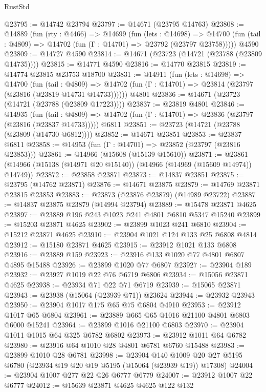 \begin{lexlean}{RustStd}
\begin{coremodule}
@23795 := @14742 @23794
@23797 := @14671 (@23795 @14763)
@23808 := @14889
    (fun (rty : @4466) =>
    @14699
      (fun (lets : @14698) =>
      @14700 (fun (tail : @4809) => @14702 (fun (Γ : @14701) => @23792 (@23797 @23758)))))
    @4590
@23809 := @14727 @4590
@23814 := @14671 (@23723 (@14721 (@23788 (@23809 @14735))))
@23815 := @14771 @4590
@23816 := @14770 @23815
@23819 := @14774 @23815 @23753 @18700
@23831 := @14911
    (fun (lets : @14698) =>
    @14700
      (fun (tail : @4809) =>
      @14702 (fun (Γ : @14701) => @23814 (@23797 (@23816 (@23819 @14731 @14733))))))
    @4801
@23836 := @14671 (@23723 (@14721 (@23788 (@23809 @17223))))
@23837 := @23819 @4801
@23846 := @14935
    (fun (tail : @4809) => @14702 (fun (Γ : @14701) => @23836 (@23797 (@23816 (@23837 @14733)))))
    @6811
@23851 := @23723 (@14721 (@23788 (@23809 (@14730 @6812))))
@23852 := @14671 @23851
@23853 := @23837 @6811
@23858 := @14953 (fun (Γ : @14701) => @23852 (@23797 (@23816 @23853)))
@23861 := @14966 (@15608 (@15139 @15610))
@23871 := @23861 (@14966 (@15138 (@14971 @20 @15140)) (@14966 (@14969 (@15609 @14974)) @14749))
@23872 := @23858 @23871
@23873 := @14837 @23851
@23875 := @23795 (@14762 @23871)
@23876 := @14671 @23875
@23879 := @14769 @23871 @23815 @23853
@23883 := @23873 (@23876 @23879) (@14989 @23722)
@23887 := @14837 @23875 @23879 (@14994 @23794)
@23889 := @15478 @23871 @4625
@23897 := @23889 @196 @243 @1023 @241 @4801 @6810 @5347 @15240
@23899 := @15203 @23871 @4625
@23902 := @23899 @1023 @241 @6810
@23904 := @15212 @23871 @4625
@23910 := @23904 @1021 @124 @133 @25 @6808 @4814
@23912 := @15180 @23871 @4625
@23915 := @23912 @1021 @133 @6808
@23916 := @23889 @159
@23923 := @23916 @133 @1020 @77 @4801 @6807 @4895 @15488
@23926 := @23899 @1020 @77 @6807
@23927 := @23904 @189
@23932 := @23927 @1019 @22 @76 @6719 @6806
@23934 := @15056 @23871 @4625
@23938 := @23934 @71 @22 @71 @6719
@23939 := @15065 @23871
@23943 := @23938 (@15064 (@23939 @71)) @23624
@23944 := @23932 @23943
@23950 := @23904 @1017 @175 @65 @75 @6804 @4910
@23953 := @23912 @1017 @65 @6804
@23961 := @23889 @665 @65 @1016 @21100 @4801 @6803 @6000 @15241
@23964 := @23899 @1016 @21100 @6803
@23970 := @23904 @1011 @1015 @64 @325 @6782 @6802
@23973 := @23912 @1011 @64 @6782
@23980 := @23916 @64 @1010 @28 @4801 @6781 @6760 @15488
@23983 := @23899 @1010 @28 @6781
@23998 := @23904
    @140
    @1009
    @20
    @27
    @5195
    @6780
    (@23934 @19 @20 @19 @5195 (@15064 (@23939 @19)) @17308)
@24004 := @23904 @1007 @277 @22 @26 @6777 @6779
@24007 := @23912 @1007 @22 @6777
@24012 := @15639 @23871 @4625 @4625 @122 @132

\end{coremodule}
\end{lexlean}
